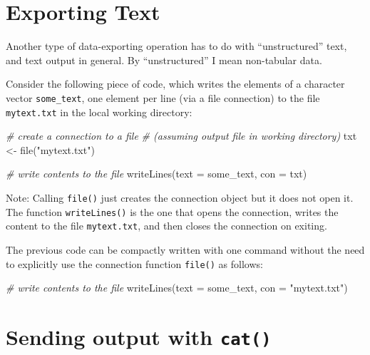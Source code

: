 \documentclass[
]{book}
\newenvironment{Shaded}{\begin{snugshade}}{\end{snugshade}}
\newcommand{\AttributeTok}[1]{\textcolor[rgb]{0.77,0.63,0.00}{#1}}
\newcommand{\CommentTok}[1]{\textcolor[rgb]{0.56,0.35,0.01}{\textit{#1}}}
\newcommand{\FunctionTok}[1]{\textcolor[rgb]{0.00,0.00,0.00}{#1}}
\newcommand{\NormalTok}[1]{#1}
\newcommand{\OtherTok}[1]{\textcolor[rgb]{0.56,0.35,0.01}{#1}}
\newcommand{\StringTok}[1]{\textcolor[rgb]{0.31,0.60,0.02}{#1}}
\begin{document}
\hypertarget{exporting-text}{%
\section{Exporting Text}\label{exporting-text}}

Another type of data-exporting operation has to do with ``unstructured'' text,
and text output in general. By ``unstructured'' I mean non-tabular data.

Consider the following piece of code, which writes the elements of a character
vector \texttt{some\_text}, one element per line (via a file connection) to the file
\texttt{mytext.txt} in the local working directory:

\begin{Shaded}
\begin{Highlighting}[]
\CommentTok{\# create a connection to a file}
\CommentTok{\# (assuming output file in working directory)}
\NormalTok{txt }\OtherTok{\textless{}{-}} \FunctionTok{file}\NormalTok{(}\StringTok{"mytext.txt"}\NormalTok{)}

\CommentTok{\# write contents to the file }
\FunctionTok{writeLines}\NormalTok{(}\AttributeTok{text =}\NormalTok{ some\_text, }\AttributeTok{con =}\NormalTok{ txt)}
\end{Highlighting}
\end{Shaded}

Note: Calling \texttt{file()} just creates the connection object but it does not open
it. The function \texttt{writeLines()} is the one that opens the connection, writes
the content to the file \texttt{mytext.txt}, and then closes the connection on exiting.

The previous code can be compactly written with one command without the need
to explicitly use the connection function \texttt{file()} as follows:

\begin{Shaded}
\begin{Highlighting}[]
\CommentTok{\# write contents to the file }
\FunctionTok{writeLines}\NormalTok{(}\AttributeTok{text =}\NormalTok{ some\_text, }\AttributeTok{con =} \StringTok{"mytext.txt"}\NormalTok{)}
\end{Highlighting}
\end{Shaded}

\hypertarget{sending-output-with-cat}{%
\section{\texorpdfstring{Sending output with \texttt{cat()}}{Sending output with cat()}}\label{sending-output-with-cat}}
\end{document}
